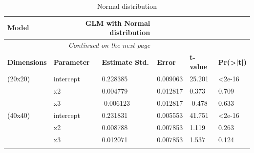 \documentclass[12pt,a4paper,twoside]{article}
\begin{document}
\begin{longtable}{l|p{}|p{}|p{}|p{}|p{}}
    \textbf{Model}      & \multicolumn{2}{r}{GLM with Normal distribution}                                                                                  \\
    \hline
    \endhead
    \hline
    \multicolumn{3}{r}{\emph{Continued on the next page}}                                                                                                   \\
    \endfoot
    \hline
    \endlastfoot
    \hline
    \textbf{Dimensions} & \textbf{Parameter}                               & \textbf{Estimate Std.} & \textbf{Error} & \textbf{t-value} & \textbf{Pr(>|t|)} \\
    \hline
    (20x20)             & intercept                                        & 0.228385               & 0.009063       & 25.201           & <2e-16            \\
                        & x2                                               & 0.004779               & 0.012817       & 0.373            & 0.709             \\
                        & x3                                               & -0.006123              & 0.012817       & -0.478           & 0.633             \\
    \hline
    (40x40)             & intercept                                        & 0.231831               & 0.005553       & 41.751           & <2e-16            \\
                        & x2                                               & 0.008788               & 0.007853       & 1.119            & 0.263             \\
                        & x3                                               & 0.012071               & 0.007853       & 1.537            & 0.124             \\
    \caption{Normal distribution}
    \label{tab:gaussiantab}
\end{longtable}
\end{document}
